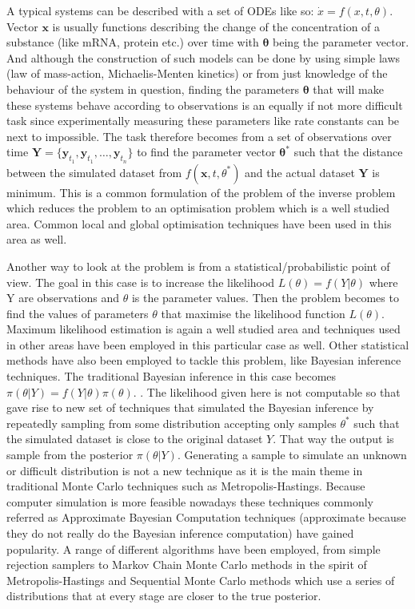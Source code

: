 \documentclass[12pt,a4paper,titlepage]{article}
\begin{document}
A typical systems can be described with a set of ODEs like so: 
$
\dot x = f(x, t, \theta)
$. 
Vector $\mathbf{x}$ is usually functions describing the change of the concentration of a substance (like mRNA, protein etc.) over time with $\mathbf{\theta}$ being the parameter vector. And although the construction of such models can be done by using simple laws (law of mass-action, Michaelis-Menten kinetics) or from just knowledge of the behaviour of the system in question, finding the parameters $\mathbf{\theta}$ that will make these systems behave according to observations is an equally if not more difficult task since experimentally measuring these parameters like rate constants can be next to impossible. The task therefore becomes from a set of observations over time $\mathbf{Y} = \{\mathbf{y}_{t_{1}}, \mathbf{y}_{t_{1}}, \dots, \mathbf{y}_{t_{n}}\} $ to find the parameter vector $\mathbf{\theta}^*$ such that the distance between the simulated dataset from $f(\mathbf{x}, t, \theta^*)$ and the actual dataset $\mathbf{Y}$ is minimum. This is a common formulation of the problem of the inverse problem which reduces the problem to an optimisation problem which is a well studied area\cite{gonze2011modeling}. Common local and global optimisation techniques have been used in this area as well\cite{moles2003parameter}.

Another way to look at the problem is from a statistical/probabilistic point of view. The goal in this case is to increase the likelihood $L(\theta) = f(Y|\theta)$ where Y are observations and $\theta$ is the parameter values\cite{filippi2011optimal}. Then the problem becomes to find the values of parameters $\theta$ that maximise the likelihood function $L(\theta)$. Maximum likelihood estimation is again a well studied area and techniques used in other areas have been employed in this particular case as well.%
Other statistical methods have also been employed to tackle this problem, like Bayesian inference techniques. The traditional Bayesian inference in this case becomes $\pi(\theta| Y)  = f(Y |\theta) \pi(\theta)$. \cite{toni2009abc}. The likelihood given here is not computable so that gave rise to new set of techniques that simulated the Bayesian inference by repeatedly sampling from some distribution accepting only samples  $\theta^*$ such that the simulated dataset is close to the original dataset $Y$. That way the output is sample from the posterior $\pi(\theta | Y)$. Generating a sample to simulate an unknown or difficult distribution is not a new technique as it is the main theme in traditional Monte Carlo techniques such as Metropolis-Hastings\cite{Walsh04markovchain}. Because computer simulation is more feasible nowadays these techniques commonly referred as Approximate Bayesian Computation techniques (approximate because they do not really do the Bayesian inference computation) have gained popularity. A range of different algorithms have been employed, from simple rejection samplers\cite{pritchard1999population} to Markov Chain Monte Carlo methods in the spirit of Metropolis-Hastings\cite{marjoram2003markov} and Sequential Monte Carlo methods which use a series of distributions that at every stage are closer to the true posterior\cite{toni2009abc}.
\end{document}
